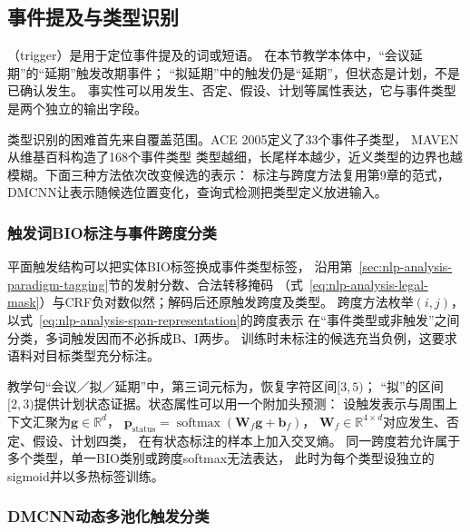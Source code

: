 \subsection{事件提及与类型识别}
\label{sec:nlp-extraction-event-detection}

（trigger）是用于定位事件提及的词或短语。
在本节教学本体中，“会议延期”的“延期”触发改期事件；
“拟延期”中的触发仍是“延期”，但状态是计划，不是已确认发生。
事实性可以用发生、否定、假设、计划等属性表达，它与事件类型是两个独立的输出字段。

类型识别的困难首先来自覆盖范围。ACE 2005定义了33个事件子类型，
MAVEN从维基百科构造了168个事件类型
类型越细，长尾样本越少，近义类型的边界也越模糊。下面三种方法依次改变候选的表示：
标注与跨度方法复用第9章的范式，DMCNN让表示随候选位置变化，查询式检测把类型定义放进输入。

\subsubsection{触发词BIO标注与事件跨度分类}
\label{sec:nlp-extraction-trigger-tagging}

平面触发结构可以把实体BIO标签换成事件类型标签，
沿用第~\ref{sec:nlp-analysis-paradigm-tagging}节的发射分数、合法转移掩码
（式~\eqref{eq:nlp-analysis-legal-mask}）与CRF负对数似然；解码后还原触发跨度及类型。
跨度方法枚举$(i,j)$，以式~\eqref{eq:nlp-analysis-span-representation}的跨度表示
在“事件类型或非触发”之间分类，多词触发因而不必拆成B、I两步。
训练时未标注的候选充当负例，这要求语料对目标类型充分标注。

教学句“会议／拟／延期”中，第三词元标为，恢复字符区间$[3,5)$；
“拟”的区间$[2,3)$提供计划状态证据。状态属性可以用一个附加头预测：
设触发表示与周围上下文汇聚为$\bm{g}\in\mathbb{R}^{d}$，
$\bm{p}_{\mathrm{status}}=\operatorname{softmax}(\bm{W}_{f}\bm{g}+\bm{b}_f)$，
$\bm{W}_f\in\mathbb{R}^{4\times d}$对应发生、否定、假设、计划四类，
在有状态标注的样本上加入交叉熵。
同一跨度若允许属于多个类型，单一BIO类别或跨度softmax无法表达，
此时为每个类型设独立的sigmoid并以多热标签训练。

\subsubsection{DMCNN动态多池化触发分类}
\label{sec:nlp-extraction-dmcnn}

